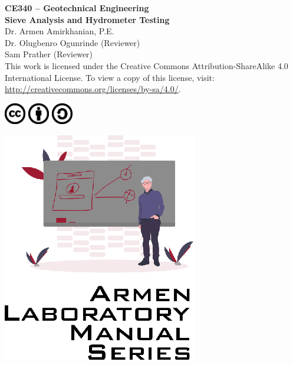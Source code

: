 \documentclass[12pt]{article}
\newcommand{\CourseNum}{CE340}
\newcommand{\CourseName}{Geotechnical Engineering}
\newcommand{\LabTitle}{Sieve Analysis and Hydrometer Testing}
\begin{document}
\begin{titlepage}
\begin{flushright}
\LARGE{\textbf{\CourseNum{} -- \CourseName}}\\
\vfill
\Huge{\textbf{\LabTitle}}\\
    \vfill
    \large Dr. Armen Amirkhanian, P.E.\\
    \normalsize Dr. Olugbenro Ogunrinde (Reviewer)\\
    \normalsize Sam Prather (Reviewer)\\
\vfill
\normalsize This work is licensed under the Creative Commons Attribution-ShareAlike 4.0 International License. To view a copy of this license, visit:
\href{http://creativecommons.org/licenses/by-sa/4.0/}{http://creativecommons.org/licenses/by-sa/4.0/}.

\includegraphics[width=0.07\textwidth]{cc.eps}
\includegraphics[width=0.07\textwidth]{by.eps}
\includegraphics[width=0.07\textwidth]{sa.eps}
\vfill

\includegraphics[width=0.3\linewidth]{Logo.eps}\\ 
 
  
\end{flushright}
\end{titlepage}
\end{document}
